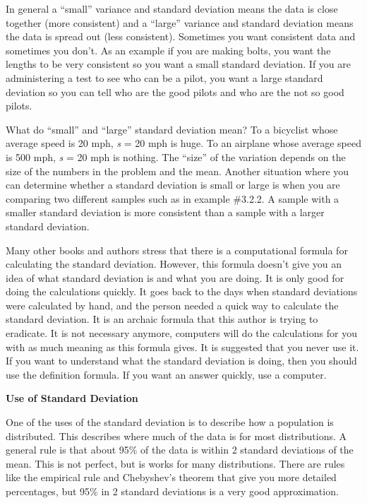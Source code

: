 \documentclass[
]{book}
\begin{document}
In general a ``small'' variance and standard deviation means the data is close together (more consistent) and a ``large'' variance and standard deviation means the data is spread out (less consistent). Sometimes you want consistent data and sometimes you don't. As an example if you are making bolts, you want the
lengths to be very consistent so you want a small standard deviation. If you are administering a test to see who can be a pilot, you want a large standard deviation so you can tell who are the good pilots and who are the not so good pilots.

What do ``small'' and ``large'' standard deviation mean? To a bicyclist whose average speed is 20 mph, \emph{s} = 20 mph is huge. To an airplane whose average speed is 500 mph, \emph{s} = 20 mph is nothing. The ``size'' of the variation depends on the size of the numbers in the problem and the mean. Another situation where you can determine whether a standard deviation is small or large is when you are comparing two different samples such as in example \#3.2.2. A sample with a smaller standard deviation is more consistent than a sample with a larger standard deviation.

Many other books and authors stress that there is a computational formula for calculating the standard deviation. However, this formula doesn't give you an idea of what standard deviation is and what you are doing. It is only good for doing the calculations quickly. It goes back to the days when standard deviations were calculated by hand, and the person needed a quick way to calculate the standard deviation. It is an archaic formula that this author is trying to eradicate. It is not necessary anymore, computers will do the calculations for you with as much meaning as this formula gives. It is suggested that you never use it. If you want to understand what the standard deviation is doing, then you should use the definition formula. If you want an answer quickly, use a computer.

\textbf{Use of Standard Deviation}

One of the uses of the standard deviation is to describe how a population is distributed. This describes where much of the data is for most distributions. A general rule is that about 95\% of the data is within 2 standard deviations of the mean. This is not perfect, but is works for many distributions. There are rules like the empirical rule and Chebyshev's theorem that give you more detailed percentages, but 95\% in 2 standard deviations is a very good approximation.
\end{document}
